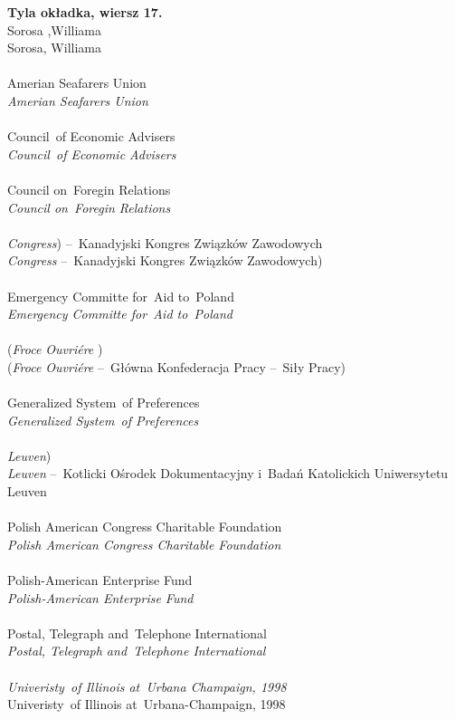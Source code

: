 \documentclass[a4paper,11pt]{article}
\numberwithin{equation}{section}
\begin{document}
\noindent
\textbf{Tyla okładka, wiersz 17.} \\
\Jest Sorosa ,Williama \\
\PowinnoByc Sorosa, Williama \\
 \\
\Jest Amerian Seafarers Union \\
\PowinnoByc \textit{Amerian Seafarers Union} \\
 \\
\Jest Council~of Economic Advisers \\
\PowinnoByc \textit{Council~of Economic Advisers} \\
 \\
\Jest Council on~Foregin Relations \\
\PowinnoByc \textit{Council on~Foregin Relations} \\
 \\
\Jest \textit{Congress}) --~Kanadyjski Kongres Związków Zawodowych \\
\PowinnoByc \textit{Congress} --~Kanadyjski Kongres Związków Zawodowych) \\
 \\
\Jest Emergency Committe for~Aid to~Poland \\
\PowinnoByc \textit{Emergency Committe for~Aid to~Poland} \\
 \\
\Jest (\textit{Froce Ouvri\'{e}re} ) \\
\PowinnoByc (\textit{Froce Ouvri\'{e}re} --~Główna Konfederacja Pracy --~Siły
Pracy) \\
 \\
\Jest Generalized System~of Preferences \\
\PowinnoByc \textit{Generalized System~of Preferences} \\
 \\
\Jest \textit{Leuven}) \\
\PowinnoByc \textit{Leuven} --~Kotlicki Ośrodek Dokumentacyjny i~Badań
Katolickich Uniwersytetu Leuven \\
 \\
\Jest Polish American Congress Charitable Foundation \\
\PowinnoByc \textit{Polish American Congress Charitable Foundation} \\
 \\
\Jest Polish-American Enterprise Fund \\
\PowinnoByc \textit{Polish-American Enterprise Fund} \\
 \\
\Jest Postal, Telegraph and~Telephone International \\
\PowinnoByc \textit{Postal, Telegraph and~Telephone International} \\
 \\
\Jest \textit{Univeristy~of Illinois at~Urbana Champaign, 1998} \\
\PowinnoByc Univeristy~of Illinois at~Urbana-Champaign, 1998 \\
\end{document}
